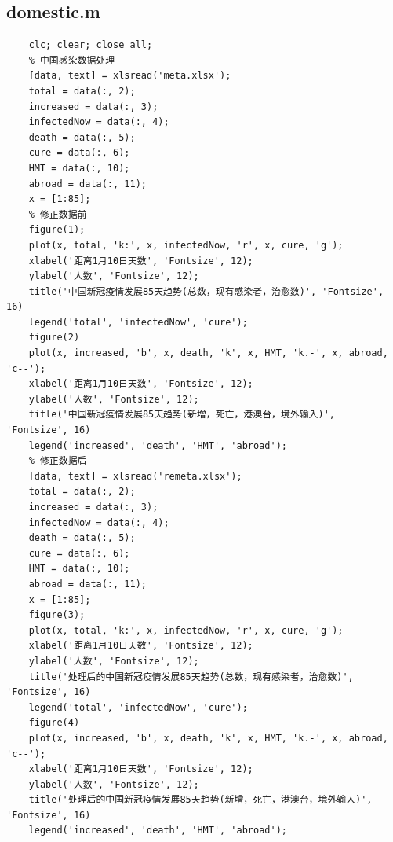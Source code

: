 \documentclass[UTF8]{ctexart}
\begin{document}
\subsection{domestic.m}
\begin{lstlisting}
    clc; clear; close all;
    % 中国感染数据处理
    [data, text] = xlsread('meta.xlsx');
    total = data(:, 2);
    increased = data(:, 3);
    infectedNow = data(:, 4);
    death = data(:, 5);
    cure = data(:, 6);
    HMT = data(:, 10);
    abroad = data(:, 11);
    x = [1:85];
    % 修正数据前
    figure(1);
    plot(x, total, 'k:', x, infectedNow, 'r', x, cure, 'g');
    xlabel('距离1月10日天数', 'Fontsize', 12);
    ylabel('人数', 'Fontsize', 12);
    title('中国新冠疫情发展85天趋势(总数，现有感染者，治愈数)', 'Fontsize', 16)
    legend('total', 'infectedNow', 'cure');
    figure(2)
    plot(x, increased, 'b', x, death, 'k', x, HMT, 'k.-', x, abroad, 'c--');
    xlabel('距离1月10日天数', 'Fontsize', 12);
    ylabel('人数', 'Fontsize', 12);
    title('中国新冠疫情发展85天趋势(新增，死亡，港澳台，境外输入)', 'Fontsize', 16)
    legend('increased', 'death', 'HMT', 'abroad');
    % 修正数据后
    [data, text] = xlsread('remeta.xlsx');
    total = data(:, 2);
    increased = data(:, 3);
    infectedNow = data(:, 4);
    death = data(:, 5);
    cure = data(:, 6);
    HMT = data(:, 10);
    abroad = data(:, 11);
    x = [1:85];
    figure(3);
    plot(x, total, 'k:', x, infectedNow, 'r', x, cure, 'g');
    xlabel('距离1月10日天数', 'Fontsize', 12);
    ylabel('人数', 'Fontsize', 12);
    title('处理后的中国新冠疫情发展85天趋势(总数，现有感染者，治愈数)', 'Fontsize', 16)
    legend('total', 'infectedNow', 'cure');
    figure(4)
    plot(x, increased, 'b', x, death, 'k', x, HMT, 'k.-', x, abroad, 'c--');
    xlabel('距离1月10日天数', 'Fontsize', 12);
    ylabel('人数', 'Fontsize', 12);
    title('处理后的中国新冠疫情发展85天趋势(新增，死亡，港澳台，境外输入)', 'Fontsize', 16)
    legend('increased', 'death', 'HMT', 'abroad');
\end{lstlisting}
\newpage
\end{document}
